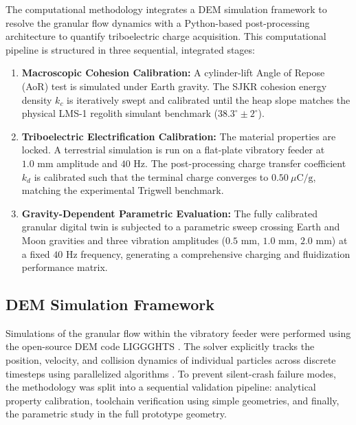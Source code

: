 \documentclass[preprint,12pt,authoryear]{elsarticle}
\begin{document}
The computational methodology integrates a DEM simulation framework to resolve the granular flow dynamics with a Python-based post-processing architecture to quantify triboelectric charge acquisition. This computational pipeline is structured in three sequential, integrated stages:
\begin{enumerate}
    \item \textbf{Macroscopic Cohesion Calibration:} A cylinder-lift Angle of Repose (AoR) test is simulated under Earth gravity. The SJKR cohesion energy density $k_c$ is iteratively swept and calibrated until the heap slope matches the physical LMS-1 regolith simulant benchmark ($38.3^\circ \pm 2^\circ$).
    \item \textbf{Triboelectric Electrification Calibration:} The material properties are locked. A terrestrial simulation is run on a flat-plate vibratory feeder at $1.0\text{ mm}$ amplitude and $40\text{ Hz}$. The post-processing charge transfer coefficient $k_d$ is calibrated such that the terminal charge converges to $0.50\ \mu\text{C/g}$, matching the experimental Trigwell benchmark.
    \item \textbf{Gravity-Dependent Parametric Evaluation:} The fully calibrated granular digital twin is subjected to a parametric sweep crossing Earth and Moon gravities and three vibration amplitudes ($0.5\text{ mm}$, $1.0\text{ mm}$, $2.0\text{ mm}$) at a fixed $40\text{ Hz}$ frequency, generating a comprehensive charging and fluidization performance matrix.
\end{enumerate}

\subsection{DEM Simulation Framework}
\label{sec:dem_framework}
Simulations of the granular flow within the vibratory feeder were performed using the open-source DEM code LIGGGHTS \citep{Kloss2012, Hager2014}. The solver explicitly tracks the position, velocity, and collision dynamics of individual particles across discrete timesteps using parallelized algorithms \citep{Plimpton1995}. To prevent silent-crash failure modes, the methodology was split into a sequential validation pipeline: analytical property calibration, toolchain verification using simple geometries, and finally, the parametric study in the full prototype geometry.
\end{document}
